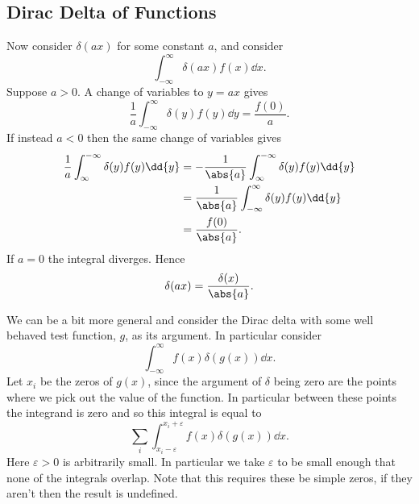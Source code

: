 \documentclass[fleqn]{NotesClass}
\begin{document}
    \subsection{Dirac Delta of Functions}
    Now consider \(\delta(ax)\) for some constant \(a\), and consider
    \begin{equation}
        \int_{-\infty}^{\infty} \delta(ax)f(x) \dd{x}.
    \end{equation}
    Suppose \(a > 0\).
    A change of variables to \(y = ax\) gives
    \begin{equation}
        \frac{1}{a}\int_{-\infty}^{\infty} \delta(y)f(y) \dd{y} = \frac{f(0)}{a}.
    \end{equation}
    If instead \(a < 0\) then the same change of variables gives
    \begin{align}
        \frac{1}{a}\int_{\infty}^{-\infty} \delta(y)f(y) \dd{y} &= -\frac{1}{\abs{a}}\int_{\infty}^{-\infty} \delta(y)f(y) \dd{y}\\
        &= \frac{1}{\abs{a}}\int_{-\infty}^{\infty} \delta(y)f(y) \dd{y}\\ &= \frac{f(0)}{\abs{a}}.
    \end{align}
    If \(a = 0\) the integral diverges.
    Hence
    \begin{equation}
        \delta(ax) = \frac{\delta(x)}{\abs{a}}.
    \end{equation}
    
    We can be a bit more general and consider the Dirac delta with some well behaved test function, \(g\), as its argument.
    In particular consider
    \begin{equation}
        \int_{-\infty}^{\infty} f(x)\delta(g(x)) \dd{x}.
    \end{equation}
    Let \(x_i\) be the zeros of \(g(x)\), since the argument of \(\delta\) being zero are the points where we pick out the value of the function.
    In particular between these points the integrand is zero and so this integral is equal to
    \begin{equation}
        \sum_{i}  \int_{x_i - \varepsilon}^{x_i + \varepsilon} f(x)\delta(g(x)) \dd{x}.
    \end{equation}
    Here \(\varepsilon > 0\) is arbitrarily small.
    In particular we take \(\varepsilon\) to be small enough that none of the integrals overlap.
    Note that this requires these be simple zeros, if they aren't then the result is undefined.
    
\end{document}
